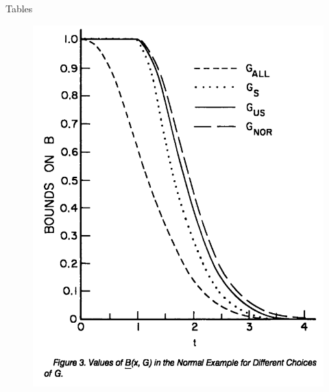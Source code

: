 \begin{frame}{Tables}

\begin{figure}[t]
\includegraphics[width=0.65\textheight]{figures/figure3}
\centering
\end{figure}

\end{frame}




